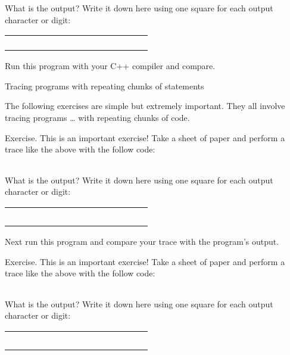 \documentclass[
]{article}
\begin{document}
What is the output? Write it down here using one square for each output
character or digit:

\begin{longtable}[]{@{}lllllllllllllll@{}}
\toprule
\endhead
& & & & & & & & & & & & & &\tabularnewline
& & & & & & & & & & & & & &\tabularnewline
& & & & & & & & & & & & & &\tabularnewline
& & & & & & & & & & & & & &\tabularnewline
\bottomrule
\end{longtable}

Run this program with your C++ compiler and compare.

Tracing programs with repeating chunks of statements

The following exercises are simple but extremely important. They all
involve tracing programs \ldots{} with repeating chunks of code.

Exercise. This is an important exercise! Take a sheet of paper and
perform a trace like the above with the follow code:

\begin{longtable}[]{@{}@{}}
\toprule
\endhead
\bottomrule
\end{longtable}

What is the output? Write it down here using one square for each output
character or digit:

\begin{longtable}[]{@{}lllllllllllllll@{}}
\toprule
\endhead
& & & & & & & & & & & & & &\tabularnewline
& & & & & & & & & & & & & &\tabularnewline
& & & & & & & & & & & & & &\tabularnewline
& & & & & & & & & & & & & &\tabularnewline
& & & & & & & & & & & & & &\tabularnewline
\bottomrule
\end{longtable}

Next run this program and compare your trace with the program's output.

Exercise. This is an important exercise! Take a sheet of paper and
perform a trace like the above with the follow code:

\begin{longtable}[]{@{}@{}}
\toprule
\endhead
\bottomrule
\end{longtable}

What is the output? Write it down here using one square for each output
character or digit:

\begin{longtable}[]{@{}lllllllllllllll@{}}
\toprule
\endhead
& & & & & & & & & & & & & &\tabularnewline
& & & & & & & & & & & & & &\tabularnewline
& & & & & & & & & & & & & &\tabularnewline
& & & & & & & & & & & & & &\tabularnewline
& & & & & & & & & & & & & &\tabularnewline
\bottomrule
\end{longtable}
\end{document}
